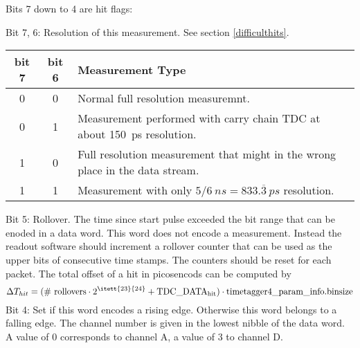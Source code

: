 	\label{flags}
	Bits 7 down to 4 are hit flags:\par
	 {
		Bit 7, 6: Resolution of this measurement. See section \ref{difficulthits}.\\
		\noindent
		\begin{small}
		\begin{tabular}{|c|c||l|}
			\hline
			bit 7 & bit 6 & Measurement Type \\\hline\hline
			0 & 0 &  Normal full resolution measuremnt.\\\hline
			0 & 1 &  Measurement performed with carry chain TDC at about 150~ps resolution.\\\hline
			1 & 0 &  Full resolution measurement that might in the wrong place in the data stream.\\\hline
			1 & 1 &  Measurement with only $5/6~ns = 833.\overline{3}~ps$ resolution. \\\hline
		\end{tabular}
		\end{small}
	}
	Bit 5: Rollover. The time since start pulse exceeded the  bit range that can be enoded in a data word. This word does not encode a measurement. 
	Instead the readout software should increment a rollover counter that can be used as the upper bits of consecutive time stamps.  The counters should be reset for each packet.
	The total offset of a hit in picosencods can be computed by
	\[	\Delta T_{hit} = \mathrm{(\#\ rollovers \cdot 2^{\itett{23}{24}} + TDC\_ DATA_{hit}) \cdot timetagger4\_param\_info.binsize} \]
	\indent
	Bit 4: Set if this word encodes a rising edge. Otherwise this word belongs to a falling edge.
	The channel number is given in the lowest nibble of the data word. A value of 0 corresponds to channel A, a value of 3 to channel D.\par
